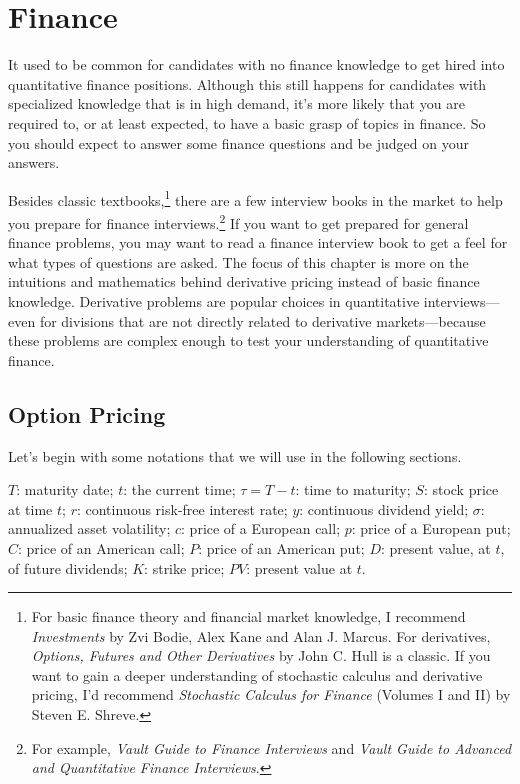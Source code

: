 
\section{Finance}

It used to be common for candidates with no finance knowledge to get hired into
quantitative finance positions. Although this still happens for candidates with specialized
knowledge that is in high demand, it's more likely that you are required to, or at least
expected, to have a basic grasp of topics in finance. So you should expect to answer
some finance questions and be judged on your answers.

Besides classic textbooks,\footnote[1]{For basic finance theory and financial market knowledge,
I recommend \emph{Investments} by Zvi Bodie, Alex Kane and Alan J. Marcus. For derivatives,
\emph{Options, Futures and Other Derivatives} by John C. Hull is a classic. If you want to gain
a deeper understanding of stochastic calculus and derivative pricing, I'd recommend
\emph{Stochastic Calculus for Finance} (Volumes I and II) by Steven E. Shreve.} there are a
few interview books in the market to help you prepare for finance interviews.\footnote[2]{For
example, \emph{Vault Guide to Finance Interviews} and \emph{Vault Guide to Advanced and
Quantitative Finance Interviews}.} If you want to get prepared for general finance problems,
you may want to read a finance interview book to get a feel for what types of questions are
asked. The focus of this chapter is more on the intuitions and mathematics behind
derivative pricing instead of basic finance knowledge. Derivative problems are popular
choices in quantitative interviews---even for divisions that are not directly related to
derivative markets---because these problems are complex enough to test your
understanding of quantitative finance.

\subsection{Option Pricing}

Let's begin with some notations that we will use in the following sections.

$T$: maturity date; $t$: the current time; $\tau=T-t$: time to maturity; $S$: stock price at
time $t$; $r$: continuous risk-free interest rate; $y$: continuous dividend yield; $\sigma$:
annualized asset volatility; $c$: price of a European call; $p$: price of a European put;
$C$: price of an American call; $P$: price of an American put; $D$: present value, at $t$,
of future dividends; $K$: strike price; $PV$: present value at $t$.

